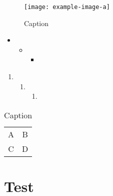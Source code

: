 \documentclass{main}
\institute{Instituto de Química}
\begin{document}
\maketitle

\lipsum[2-4]

\begin{figure}[!ht]
    \centering
    \texttt{[image: example-image-a]}
    \caption{Caption}
    \label{fig:my_label}
\end{figure}

\lipsum[2-4]

\begin{itemize}
    \item \lipsum[1-1]
    \begin{itemize}
        \item \lipsum[1-1]
        \begin{itemize}
            \item \lipsum[1-1]
        \end{itemize}
    \end{itemize}
\end{itemize}

\begin{enumerate}
    \item \lipsum[1-1]
    \begin{enumerate}
        \item \lipsum[1-1]
        \begin{enumerate}
            \item \lipsum[1-1]
        \end{enumerate}
    \end{enumerate}
\end{enumerate}

\begin{table}[t]
    \centering
    \caption{Caption}
    \begin{tabular}{cc}
        A & B  \\
        C & D 
    \end{tabular}
    \label{tab:my_label}
\end{table}

\section*{Test}
\lipsum[1-1]
\end{document}
